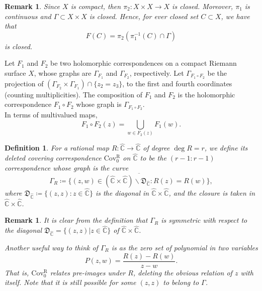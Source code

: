 \documentclass[11pt,letterpaper]{article}
\newtheorem{definition}[theorem]{Definition}
\newtheorem{remark}[theorem]{Remark}
\theoremstyle{definition}
\def\covr{\operatorname{Cov^R_0}}
\def\F{\mathcal{F}_a}
\begin{document}
\begin{remark} Since $X$ is compact, then $\pi_2:X\times X\to X$ is closed. Moreover, $\pi_1$ is continuous and $\Gamma\subset X\times X$ is closed. Hence, for ever closed set $C\subset X$, we have that
$$F(C)=\pi_2(\pi_1^{-1}(C)\cap\Gamma)$$
is closed.
\end{remark}


Let $F_1$ and $F_2$ be two holomorphic correspondences on a compact Riemann surface $X$, whose graphs are $\Gamma_{F_1}$ and $\Gamma_{F_2}$, respectively. Let $\Gamma_{F_1\circ F_2}$ be the projection of $(\Gamma_{F_2}\times\Gamma_{F_1})\cap\lbrace z_2=z_3\rbrace$, to the first and fourth coordinates (counting multiplicities). The composition of $F_1$ and $F_2$ is the holomorphic correspondence $F_1\circ F_2$ whose graph is $\Gamma_{F_1\circ F_2}$.
\\
In terms of multivalued maps,
$$F_1\circ F_2(z)=\bigcup_{w\in F_2(z)}F_1(w).$$


\begin{definition} For a rational map $R:\widehat{\mathbb{C}}\to\widehat{\mathbb{C}}$ of degree $\deg{R}=r$, we define its \emph{deleted covering correspondence} $\covr$ on $\widehat{\mathbb{C}}$ to be the $(r-1:r-1)$ correspondence whose graph is the curve
$$\Gamma_R\coloneqq\overline{\lbrace (z,w)\in(\widehat{\mathbb{C}}\times\widehat{\mathbb{C}})\smallsetminus\mathfrak{D}_{\widehat{\mathbb{C}}}: R(z)=R(w)\rbrace},$$
where $\mathfrak{D}_{\widehat{\mathbb{C}}}\coloneqq\lbrace (z,z):z\in\widehat{\mathbb{C}}\rbrace$ is the diagonal in $\widehat{\mathbb{C}}\times\widehat{\mathbb{C}}$, and the closure is taken in $\widehat{\mathbb{C}}\times\widehat{\mathbb{C}}$.
\end{definition}

\begin{remark} It is clear from the definition that $\Gamma_R$ is symmetric with respect to the diagonal $\mathfrak{D}_{\widehat{\mathbb{C}}}=\lbrace(z,z)|z\in\widehat{\mathbb{C}}\rbrace$ of $\widehat{\mathbb{C}}\times\widehat{\mathbb{C}}$.

Another useful way to think of $\Gamma_R$ is as the zero set of polynomial in two variables
$$P(z,w)=\frac{R(z)-R(w)}{z-w}.$$
That is, $\covr$ relates pre-images under $R$, deleting the obvious relation of $z$ with itself. Note that it is still possible for some $(z,z)$ to belong to $\Gamma$.
\end{remark}
\end{document}

